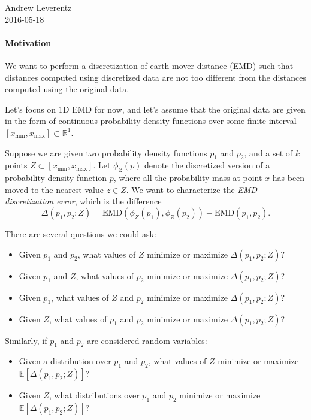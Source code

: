 \documentclass[11pt]{article}
\newcommand{\EMD}{\mathrm{EMD}}
\newcommand{\xmin}{x_\mathrm{min}}
\newcommand{\xmax}{x_\mathrm{max}}
\theoremstyle{definition}
\begin{document}
\begin{flushright}
Andrew Leverentz \\
2016-05-18
\end{flushright}

\paragraph{Motivation} We want to perform a discretization of earth-mover distance (EMD) such that distances computed using discretized data are not too different from the distances computed using the original data.

Let's focus on 1D EMD for now, and let's assume that the original data are given in the form of continuous probability density functions over some finite interval $[\xmin, \xmax] \subset \mathbb R^1$.

Suppose we are given two probability density functions $p_1$ and $p_2$, and a set of $k$ points $Z \subset [\xmin, \xmax]$.  Let $\phi_Z(p)$ denote the discretized version of a probability density function $p$, where all the probability mass at point $x$ has been moved to the nearest value $z \in Z$.  We want to characterize the \emph{EMD discretization error}, which is the difference
\[ \Delta(p_1, p_2; Z) = \EMD(\phi_Z(p_1), \phi_Z(p_2)) - \EMD(p_1, p_2). \]

\noindent There are several questions we could ask:
\begin{itemize}
\item Given $p_1$ and $p_2$, what values of $Z$ minimize or maximize $\Delta(p_1, p_2; Z)$?
\item Given $p_1$ and $Z$, what values of $p_2$ minimize or maximize $\Delta(p_1, p_2; Z)$?
\item Given $p_1$, what values of $Z$ and $p_2$ minimize or maximize $\Delta(p_1, p_2; Z)$?
\item Given $Z$, what values of $p_1$ and $p_2$ minimize or maximize $\Delta(p_1, p_2; Z)$?
\end{itemize}

\noindent Similarly, if $p_1$ and $p_2$ are considered random variables:
\begin{itemize}
\item Given a distribution over $p_1$ and $p_2$, what values of $Z$ minimize or maximize $\mathbb E[\Delta(p_1, p_2; Z)]$?
\item Given $Z$, what distributions over $p_1$ and $p_2$ minimize or maximize $\mathbb E[\Delta(p_1, p_2; Z)]$?
\end{itemize}
\end{document}
